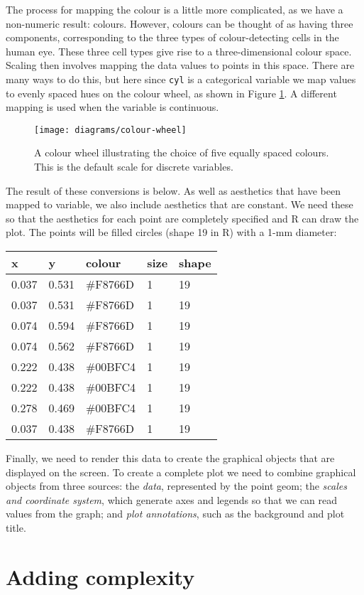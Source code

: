 The process for mapping the colour is a little more complicated, as we
have a non-numeric result: colours. However, colours can be thought of
as having three components, corresponding to the three types of
colour-detecting cells in the human eye. These three cell types give
rise to a three-dimensional colour space. Scaling then involves mapping
the data values to points in this space. There are many ways to do this,
but here since \texttt{cyl} is a categorical variable we map values to
evenly spaced hues on the colour wheel, as shown in Figure
\ref{fig:colour-wheel}. A different mapping is used when the variable is
continuous. 

\begin{figure}[htbp]
  \centering
    \texttt{[image: diagrams/colour-wheel]}
  \caption{A colour wheel illustrating the choice of five equally spaced colours. This is the default scale for discrete variables.}
  \label{fig:colour-wheel}
\end{figure}

The result of these conversions is below. As well as aesthetics that
have been mapped to variable, we also include aesthetics that are
constant. We need these so that the aesthetics for each point are
completely specified and R can draw the plot. The points will be filled
circles (shape 19 in R) with a 1-mm diameter:

\begin{longtable}[]{@{}lllll@{}}
\toprule
x & y & colour & size & shape\tabularnewline
\midrule
\endhead
0.037 & 0.531 & \#F8766D & 1 & 19\tabularnewline
0.037 & 0.531 & \#F8766D & 1 & 19\tabularnewline
0.074 & 0.594 & \#F8766D & 1 & 19\tabularnewline
0.074 & 0.562 & \#F8766D & 1 & 19\tabularnewline
0.222 & 0.438 & \#00BFC4 & 1 & 19\tabularnewline
0.222 & 0.438 & \#00BFC4 & 1 & 19\tabularnewline
0.278 & 0.469 & \#00BFC4 & 1 & 19\tabularnewline
0.037 & 0.438 & \#F8766D & 1 & 19\tabularnewline
\bottomrule
\end{longtable}

Finally, we need to render this data to create the graphical objects
that are displayed on the screen. To create a complete plot we need to
combine graphical objects from three sources: the \emph{data},
represented by the point geom; the \emph{scales and coordinate system},
which generate axes and legends so that we can read values from the
graph; and \emph{plot annotations}, such as the background and plot
title.

\hypertarget{sec:complex-plot}{%
\section{Adding complexity}\label{sec:complex-plot}}

